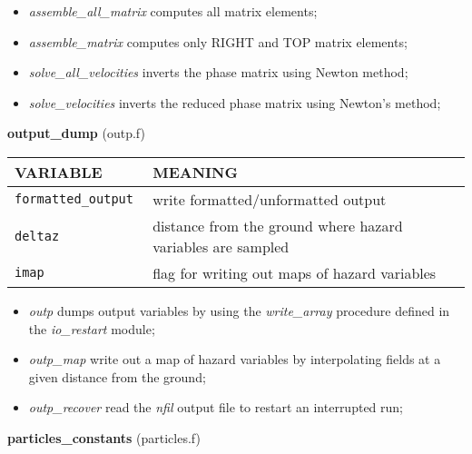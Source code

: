 \begin{itemize}
\item{\em assemble\_all\_matrix} computes all matrix elements;
\item{\em assemble\_matrix} computes only RIGHT and TOP matrix elements;
\item{\em solve\_all\_velocities} inverts the phase matrix using Newton method;
\item{\em solve\_velocities} inverts the reduced phase matrix using Newton's method;
\end{itemize}
%
%
{\large{\bf output\_dump}} (outp.f)\\[5mm]
\begin{tabular}{|p{6cm}|p{6cm}|}\hline
VARIABLE &  MEANING\\\hline
\tt  formatted\_output  & write formatted/unformatted output \\\hline
\tt  deltaz  & distance from the ground where hazard variables are sampled \\\hline
\tt  imap  & flag for writing out maps of hazard variables \\\hline
\end{tabular}
\begin{itemize}
\item{\em outp} dumps output variables by using the {\em write\_array} procedure defined in the {\em io\_restart}
 module;
\item{\em outp\_map} write out a map of hazard variables by interpolating fields at a given distance from the ground;
\item{\em outp\_recover} read the {\em nfil} output file to restart an interrupted run;
\end{itemize}
%
%
{\large{\bf particles\_constants}} (particles.f)\\[5mm]
